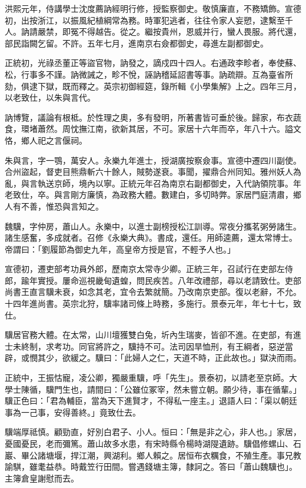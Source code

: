 \begin{pinyinscope}
洪熙元年，侍講學士沈度薦訥經明行修，授監察御史。敬慎廉直，不務矯飾。宣德初，出按浙江，以振風紀植綱常為務。時軍犯逃者，往往令家人妄愬，逮繫至千人。訥請嚴禁，即冤不得越告。從之。繼按貴州，恩威并行，蠻人畏服。將代還，部民詣闕乞留。不許。五年七月，進南京右僉都御史，尋進左副都御史。

正統初，光祿丞董正等盜官物，訥發之，謫戍四十四人。右通政李畛者，奉使蘇、松，行事多不謹。訥微誡之，畛不悅，誣訥稽延詔書等事。訥疏辯。互為臺省所劾，俱逮下獄，既而釋之。英宗初御經筵，錄所輯《小學集解》上之。四年三月，以老致仕，以朱與言代。

訥博覽，議論有根柢。於性理之奧，多有發明，所著書皆可垂於後。歸家，布衣蔬食，環堵蕭然。周忱撫江南，欲新其居，不可。家居十六年而卒，年八十六。謚文恪，鄉人祀之言偃祠。

朱與言，字一鶚，萬安人。永樂九年進士，授湖廣按察僉事。宣德中遷四川副使。合州盜起，督吏目熊鼎斬六十餘人，賊勢遂衰。事聞，擢鼎合州同知。雅州妖人為亂，與言執送京師，境內以寧。正統元年召為南京右副都御史，入代訥領院事。年老致仕，卒。與言剛方廉慎，為政務大體。數建白，多切時弊。家居門庭清肅，鄉人有不善，惟恐與言知之。

魏驥，字仲房，蕭山人。永樂中，以進士副榜授松江訓導。常夜分攜茗粥勞諸生。諸生感奮，多成就者。召修《永樂大典》。書成，還任。用師逵薦，還太常博士。帝謂曰：「劉履節為御史九年，高皇帝方授是官，不輕予人也。」

宣德初，遷吏部考功員外郎，歷南京太常寺少卿。正統三年，召試行在吏部左侍郎，踰年實授。屢命巡視畿甸遺蝗，問民疾苦。八年改禮部，尋以老請致仕。吏部尚書王直言驥未衰，如念其老，宜令去繁就簡。乃改南京吏部。復以老辭，不允。十四年進尚書。英宗北狩，驥率諸司條上時務，多施行。景泰元年，年七十七，致仕。

驥居官務大體。在太常，山川壇獲雙白兔，圻內生瑞麥，皆卻不進。在吏部，有進士未終制，求考功。同官將許之，驥持不可。法司因旱恤刑，有王綱者，惡逆當辟，或憫其少，欲緩之。驥曰：「此婦人之仁，天道不時，正此故也。」獄決而雨。

正統中，王振怙寵，凌公卿，獨嚴重驥，呼「先生」。景泰初，以請老至京師。大學士陳循，驥門生也，請間曰：「公雖位冢宰，然未嘗立朝。願少待，事在循輩。」驥正色曰：「君為輔臣，當為天下進賢才，不得私一座主。」退語人曰：「渠以朝廷事為一己事，安得善終。」竟致仕去。

驥端厚祗慎。顧勁直，好別白君子、小人。恒曰：「無是非之心，非人也。」家居，憂國憂民，老而彌篤。蕭山故多水患，有宋時縣令楊時湖隄遺跡。驥倡修螺山、石巖、畢公諸塘堰，捍江潮，興湖利。鄉人賴之。居恒布衣糲食，不殖生產。事兄教諭騏，雖耄益恭。時戴笠行田間。嘗遇錢塘主簿，隸訶之。答曰「蕭山魏驥也」。主簿倉皇謝慰而去。


\end{pinyinscope}
